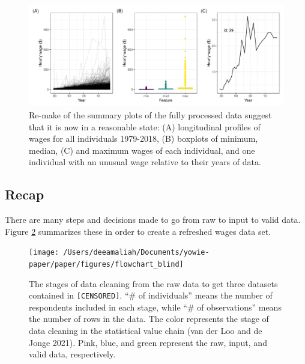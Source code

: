 \documentclass[12pt]{article}
\begin{document}
\begin{figure}

{\centering \includegraphics[width=1\linewidth]{figures/fixed-feature-plot-1}

}

\caption{Re-make of the summary plots of the fully processed data suggest that it is now in a reasonable state: (A) longitudinal profiles of wages for all individuals 1979-2018, (B) boxplots of minimum, median, (C) and maximum wages of each individual, and one individual with an unusual wage relative to their years of data. }\label{fig:fixed-feature-plot}
\end{figure}

\hypertarget{recap}{%
\subsection{Recap}\label{recap}}

There are many steps and decisions made to go from raw to input to valid data. Figure \ref{fig:flow-chart-blind} summarizes these in order to create a refreshed wages data set.



\begin{figure}

{\centering \texttt{[image: /Users/deeamaliah/Documents/yowie-paper/paper/figures/flowchart\_blind]}

}

\caption{The stages of data cleaning from the raw data to get three datasets contained in \texttt{[CENSORED]}. ``\# of individuals'' means the number of respondents included in each stage, while ``\# of observations'' means the number of rows in the data. The color represents the stage of data cleaning in the statistical value chain (van der Loo and de Jonge 2021). Pink, blue, and green represent the raw, input, and valid data, respectively.}\label{fig:flow-chart-blind}
\end{figure}
\end{document}
